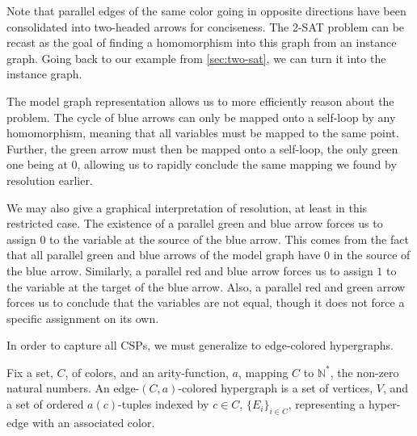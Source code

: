 Note that parallel edges of the same color going in opposite directions have been consolidated into two-headed arrows for conciseness. The 2-SAT problem can be recast as the goal of finding a homomorphism into this graph from an instance graph. Going back to our example from \ref{sec:two-sat}, we can turn it into the instance graph.

\begin{center}
\end{center}

The model graph representation allows us to more efficiently reason about the problem. The cycle of blue arrows can only be mapped onto a self-loop by any homomorphism, meaning that all variables must be mapped to the same point. Further, the green arrow must then be mapped onto a self-loop, the only green one being at $0$, allowing us to rapidly conclude the same mapping we found by resolution earlier.

We may also give a graphical interpretation of resolution, at least in this restricted case. The existence of a parallel green and blue arrow forces us to assign $0$ to the variable at the source of the blue arrow. This comes from the fact that all parallel green and blue arrows of the model graph have $0$ in the source of the blue arrow. Similarly, a parallel red and blue arrow forces us to assign $1$ to the variable at the target of the blue arrow. Also, a parallel red and green arrow forces us to conclude that the variables are not equal, though it does not force a specific assignment on its own.

In order to capture all CSPs, we must generalize to edge-colored hypergraphs. 

\begin{definition}
Fix a set, $C$, of colors, and an arity-function, $a$, mapping $C$ to $\mathbb{N}^*$, the non-zero natural numbers. An edge-$(C, a)$-colored hypergraph is a set of vertices, $V$, and a set of ordered $a(c)$-tuples indexed by $c \in C$, $\{E_i\}_{i\in C}$, representing a hyper-edge with an associated color. 
\end{definition}

